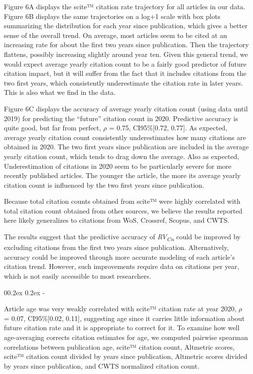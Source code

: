 \documentclass[
  man,floatsintext]{apa6}
\makeatletter
\let\oldsubparagraph\subparagraph
\renewcommand{\subparagraph}[1]{\oldsubparagraph{#1}\mbox{}}
\renewcommand{\subparagraph}[1]{\@startsection{subparagraph}{5}{1em}%
  {0\baselineskip \@plus 0.2ex \@minus 0.2ex}%
  {-\z@\relax}%
  {\normalfont\normalsize\itshape\hspace{\parindent}{#1}\textit{\addperi}}{\relax}}
\makeatother
\begin{document}
Figure 6A displays the scite™ citation rate trajectory for all articles in our data. Figure 6B displays the same trajectories on a log+1 scale with box plots summarizing the distribution for each year since publication, which gives a better sense of the overall trend. On average, most articles seem to be cited at an increasing rate for about the first two years since publication. Then the trajectory flattens, possibly increasing slightly around year ten. Given this general trend, we would expect average yearly citation count to be a fairly good predictor of future citation impact, but it will suffer from the fact that it includes citations from the two first years, which consistently underestimate the citation rate in later years. This is also what we find in the data.

Figure 6C displays the accuracy of average yearly citation count (using data until 2019) for predicting the ``future'' citation count in 2020. Predictive accuracy is quite good, but far from perfect, \(\rho\) = 0.75, CI95\%{[}0.72, 0.77{]}. As expected, average yearly citation count consistently underestimates how many citations are obtained in 2020. The two first years since publication are included in the average yearly citation count, which tends to drag down the average. Also as expected, Underestimation of citations in 2020 seem to be particularly severe for more recently published articles. The younger the article, the more its average yearly citation count is influenced by the two first years since publication.

Because total citation counts obtained from scite™ were highly correlated with total citation count obtained from other sources, we believe the results reported here likely generalizes to citations from WoS, Crossref, Scopus, and CWTS.

The results suggest that the predictive accuracy of \emph{RV\textsubscript{Cn}} could be improved by excluding citations from the first two years since publication. Alternatively, accuracy could be improved through more accurate modeling of each article's citation trend. However, such improvements require data on citations per year, which is not easily accessible to most researchers.

\hypertarget{predictive-unbiasedness}{%
\subparagraph{Predictive unbiasedness}\label{predictive-unbiasedness}}

Article age was very weakly correlated with scite™ citation rate at year 2020, \(\rho\) = 0.07, CI95\%{[}0.02, 0.11{]}, suggesting age since it carries little information about future citation rate and it is appropriate to correct for it. To examine how well age-averaging corrects citation estimates for age, we computed pairwise spearman correlations between publication age, scite™ citation count, Altmetric scores, scite™ citation count divided by years since publication, Altmetric scores divided by years since publication, and CWTS normalized citation count.
\end{document}
